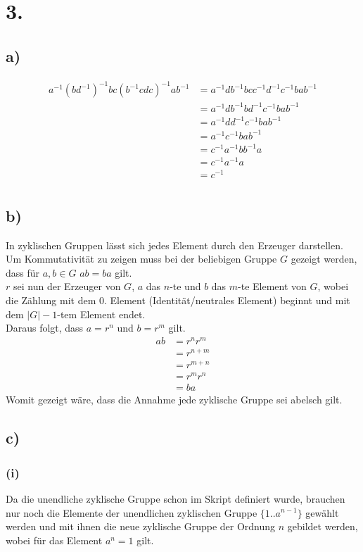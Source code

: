 \documentclass[a4paper]{scrartcl}
\begin{document}
\section{3.}
	\subsection{a)}
		\begin{align}
			a^{-1}(bd^{-1})^{-1}bc(b^{-1}cdc)^{-1}ab^{-1}&= 
			a^{-1}db^{-1} bcc^{-1}d^{-1}c^{-1}bab^{-1} \\
			&=a^{-1}db^{-1} bd^{-1}c^{-1}bab^{-1} \\
			&=a^{-1}dd^{-1}c^{-1}bab^{-1} \\
			&=a^{-1}c^{-1}bab^{-1} \\
			&=c^{-1}a^{-1}bb^{-1}a \\
			&=c^{-1}a^{-1}a \\
			&=c^{-1} \\
		\end{align}
		
	\subsection{b)}
		In zyklischen Gruppen lässt sich jedes Element durch den Erzeuger darstellen. Um 
		Kommutativität zu zeigen muss bei der beliebigen Gruppe \(G\) gezeigt werden, dass für 
		\(a,b\in G\) \(ab=ba\) gilt. \\
		\(r\) sei nun der Erzeuger von \(G\), \(a\) das \(n\)-te und \(b\) das \(m\)-te Element von 
		\(G\), wobei die Zählung mit dem 0. Element (Identität/neutrales Element) beginnt und mit dem 
		\(|G|-1\)-tem Element endet. \\
		Daraus folgt, dass \(a=r^n\) und \(b=r^m\) gilt. \\
		\begin{align}
			ab&= r^nr^m \\
			&= r^{n+m} \\
			&= r^{m+n} \\
			&= r^mr^n \\
			&= ba
		\end{align}
		Womit gezeigt wäre, dass die Annahme jede zyklische Gruppe sei abelsch gilt.
	
	\subsection{c)}
		\subsubsection{(i)}
			Da die unendliche zyklische Gruppe schon im Skript definiert wurde, brauchen nur noch die 
			Elemente der unendlichen zyklischen Gruppe \(\{1..a^{n-1}\}\) gewählt werden und mit
			ihnen die neue zyklische Gruppe der Ordnung \(n\) gebildet werden, wobei für das Element 
			\(a^n = 1\) gilt.
\end{document}

